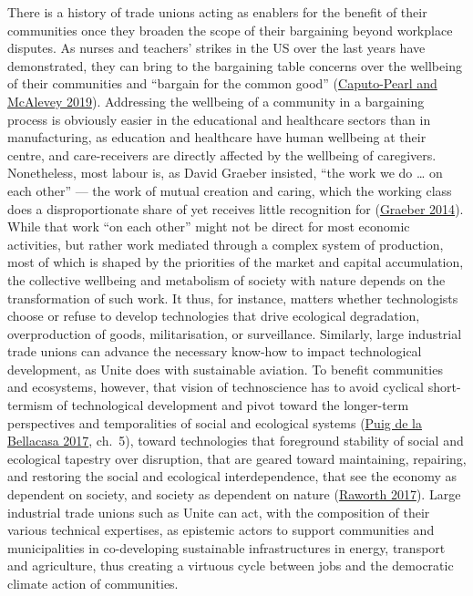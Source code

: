 \documentclass[a4paper, nobind]{templates/ociamthesis}
\begin{document}
There is a history of trade unions acting as enablers for the benefit of their communities once they broaden the scope of their bargaining beyond workplace disputes. As nurses and teachers' strikes in the US over the last years have demonstrated, they can bring to the bargaining table concerns over the wellbeing of their communities and ``bargain for the common good'' (\protect\hyperlink{ref-caputo-pearl_there_2019}{Caputo-Pearl and McAlevey 2019}). Addressing the wellbeing of a community in a bargaining process is obviously easier in the educational and healthcare sectors than in manufacturing, as education and healthcare have human wellbeing at their centre, and care-receivers are directly affected by the wellbeing of caregivers. Nonetheless, most labour is, as David Graeber insisted, ``the work we do \ldots{} on each other'' --- the work of mutual creation and caring, which the working class does a disproportionate share of yet receives little recognition for (\protect\hyperlink{ref-graeber_caring_2014}{Graeber 2014}). While that work ``on each other'' might not be direct for most economic activities, but rather work mediated through a complex system of production, most of which is shaped by the priorities of the market and capital accumulation, the collective wellbeing and metabolism of society with nature depends on the transformation of such work. It thus, for instance, matters whether technologists choose or refuse to develop technologies that drive ecological degradation, overproduction of goods, militarisation, or surveillance. Similarly, large industrial trade unions can advance the necessary know-how to impact technological development, as Unite does with sustainable aviation. To benefit communities and ecosystems, however, that vision of technoscience has to avoid cyclical short-termism of technological development and pivot toward the longer-term perspectives and temporalities of social and ecological systems (\protect\hyperlink{ref-puig_de_la_bellacasa_matters_2017}{Puig de la Bellacasa 2017}, ch.~5), toward technologies that foreground stability of social and ecological tapestry over disruption, that are geared toward maintaining, repairing, and restoring the social and ecological interdependence, that see the economy as dependent on society, and society as dependent on nature (\protect\hyperlink{ref-raworth_doughnut_2017}{Raworth 2017}). Large industrial trade unions such as Unite can act, with the composition of their various technical expertises, as epistemic actors to support communities and municipalities in co-developing sustainable infrastructures in energy, transport and agriculture, thus creating a virtuous cycle between jobs and the democratic climate action of communities.
\end{document}
